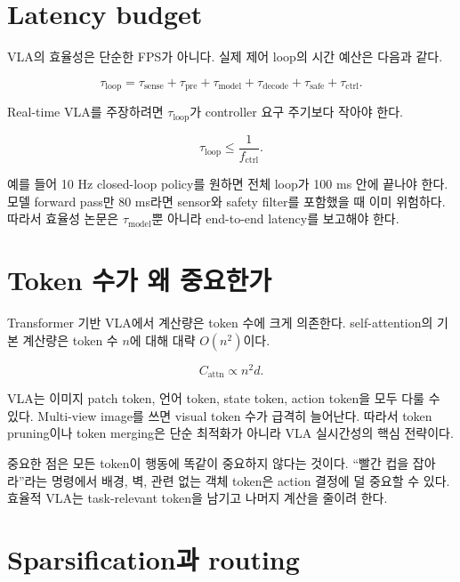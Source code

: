 \section{Latency budget}

VLA의 효율성은 단순한 FPS가 아니다. 실제 제어 loop의 시간 예산은 다음과 같다.

\begin{equation}
  \tau_{\mathrm{loop}}
  =
  \tau_{\mathrm{sense}}
  +
  \tau_{\mathrm{pre}}
  +
  \tau_{\mathrm{model}}
  +
  \tau_{\mathrm{decode}}
  +
  \tau_{\mathrm{safe}}
  +
  \tau_{\mathrm{ctrl}}.
  \label{eq:eff_latency_budget}
\end{equation}

Real-time VLA를 주장하려면 $\tau_{\mathrm{loop}}$가 controller 요구 주기보다 작아야 한다.

\begin{equation}
  \tau_{\mathrm{loop}} \le \frac{1}{f_{\mathrm{ctrl}}}.
\end{equation}

예를 들어 10 Hz closed-loop policy를 원하면 전체 loop가 100 ms 안에 끝나야 한다. 모델 forward pass만 80 ms라면 sensor와 safety filter를 포함했을 때 이미 위험하다. 따라서 효율성 논문은 $\tau_{\mathrm{model}}$뿐 아니라 end-to-end latency를 보고해야 한다.

\section{Token 수가 왜 중요한가}

Transformer 기반 VLA에서 계산량은 token 수에 크게 의존한다. self-attention의 기본 계산량은 token 수 $n$에 대해 대략 $O(n^2)$이다.

\begin{equation}
  C_{\mathrm{attn}} \propto n^2 d.
\end{equation}

VLA는 이미지 patch token, 언어 token, state token, action token을 모두 다룰 수 있다. Multi-view image를 쓰면 visual token 수가 급격히 늘어난다. 따라서 token pruning이나 token merging은 단순 최적화가 아니라 VLA 실시간성의 핵심 전략이다.

중요한 점은 모든 token이 행동에 똑같이 중요하지 않다는 것이다. ``빨간 컵을 잡아라''라는 명령에서 배경, 벽, 관련 없는 객체 token은 action 결정에 덜 중요할 수 있다. 효율적 VLA는 task-relevant token을 남기고 나머지 계산을 줄이려 한다.

\section{Sparsification과 routing}


